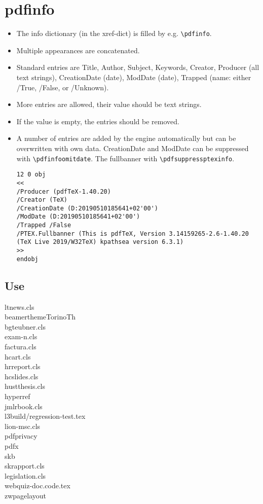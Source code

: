 \documentclass{article}
\begin{document}
\section{pdfinfo}
\begin{itemize}
\item The info dictionary (in the xref-dict) is filled by e.g. \verb+\pdfinfo+. 
\item Multiple appearances are concatenated.
\item Standard entries are Title, Author, Subject, Keywords, Creator, Producer (all text strings), CreationDate (date), ModDate (date), Trapped (name: either /True, /False, or /Unknown).
\item More entries are allowed, their value should be text strings.
\item If the value is empty, the entries should be removed.    
\item A number of entries are added by the engine automatically but can be overwritten with own data. 
CreationDate and ModDate can be suppressed with \verb+\pdfinfoomitdate+. The fullbanner with \verb+\pdfsuppressptexinfo+.
\begin{verbatim}
12 0 obj
<<
/Producer (pdfTeX-1.40.20)
/Creator (TeX)
/CreationDate (D:20190510185641+02'00')
/ModDate (D:20190510185641+02'00')
/Trapped /False
/PTEX.Fullbanner (This is pdfTeX, Version 3.14159265-2.6-1.40.20 (TeX Live 2019/W32TeX) kpathsea version 6.3.1)
>>
endobj
\end{verbatim}
\end{itemize}

\subsection{Use}
\begin{description}
  \item[ltnews.cls] 
  \item[beamerthemeTorinoTh] 
  \item[bgteubner.cls] 
  \item[exam-n.cls] 
  \item[factura.cls]
  \item[hcart.cls]
  \item[hrreport.cls]
  \item[hcslides.cls]
  \item[hustthesis.cls]
  \item[hyperref]
  \item[jmlrbook.cls]
  \item[l3build/regression-test.tex]
  \item[lion-msc.cls]
  \item[pdfprivacy]
  \item[pdfx]
  \item[skb]
  \item[skrapport.cls]
  \item[legislation.cls]
  \item[webquiz-doc.code.tex]
  \item[zwpagelayout]
  
\end{description}
\end{document}
